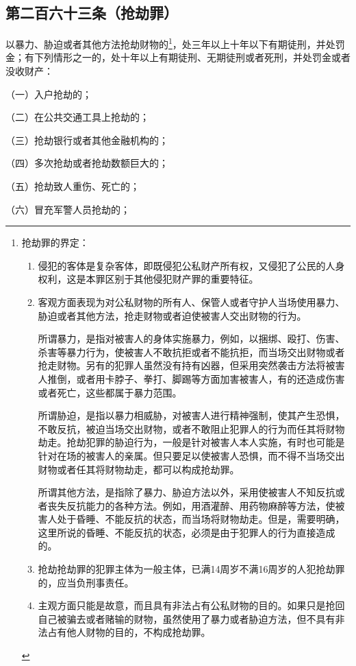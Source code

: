 \documentclass[utf-8,10pt]{ctexart}
\begin{document}
\subsection{第二百六十三条（抢劫罪）}
以暴力、胁迫或者其他方法抢劫财物的\footnote{
抢劫罪的界定：
\begin{enumerate}
\item 侵犯的客体是复杂客体，即既侵犯公私财产所有权，又侵犯了公民的人身权利，这是本罪区别于其他侵犯财产罪的重要特征。
\item 客观方面表现为对公私财物的所有人、保管人或者守护人当场使用暴力、胁迫或者其他方法，抢走财物或者迫使被害人交出财物的行为。

    所谓暴力，是指对被害人的身体实施暴力，例如，以捆绑、殴打、伤害、杀害等暴力行为，使被害人不敢抗拒或者不能抗拒，而当场交出财物或者抢走财物。另有的犯罪人虽然没有持有凶器，但采用突然袭击方法将被害人推倒，或者用卡脖子、拳打、脚踢等方面加害被害人，有的还造成伤害或者死亡，这些都属于暴力范围。

    所谓胁迫，是指以暴力相威胁，对被害人进行精神强制，使其产生恐惧，不敢反抗，被迫当场交出财物，或者不敢阻止犯罪人的行为而任其将财物劫走。抢劫犯罪的胁迫行为，一般是针对被害人本人实施，有时也可能是针对在场的被害人的亲属。但只要足以使被害人恐惧，而不得不当场交出财物或者任其将财物劫走，都可以构成抢劫罪。

    所谓其他方法，是指除了暴力、胁迫方法以外，采用使被害人不知反抗或者丧失反抗能力的各种方法。例如，用酒灌醉、用药物麻醉等方法，使被害人处于昏睡、不能反抗的状态，而当场将财物劫走。但是，需要明确，这里所说的昏睡、不能反抗的状态，必须是由于犯罪人的行为直接造成的。
\item 抢劫抢劫罪的犯罪主体为一般主体，已满14周岁不满16周岁的人犯抢劫罪的，应当负刑事责任。
\item 主观方面只能是故意，而且具有非法占有公私财物的目的。如果只是抢回自己被骗去或者赌输的财物，虽然使用了暴力或者胁迫方法，但不具有非法占有他人财物的目的，不构成抢劫罪。
\end{enumerate}
}，处三年以上十年以下有期徒刑，并处罚金；有下列情形之一的，处十年以上有期徒刑、无期徒刑或者死刑，并处罚金或者没收财产：

（一）入户抢劫的；

（二）在公共交通工具上抢劫的；

（三）抢劫银行或者其他金融机构的；

（四）多次抢劫或者抢劫数额巨大的；

（五）抢劫致人重伤、死亡的；

（六）冒充军警人员抢劫的；
\end{document}
